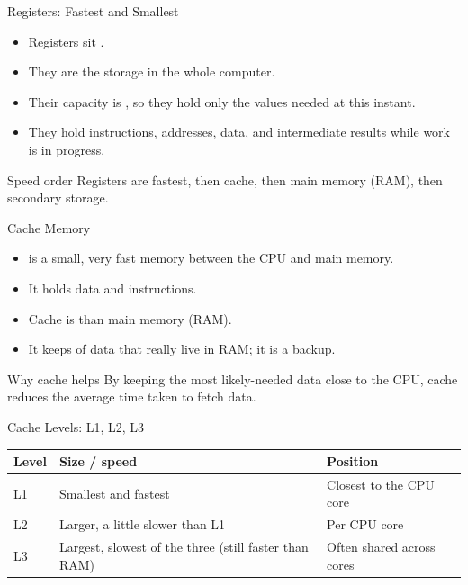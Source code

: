 \documentclass[aspectratio=169]{beamer}
\begin{document}
\begin{frame}{Registers: Fastest and Smallest}
  \begin{itemize}
    \item Registers sit .
    \item They are the  storage in the whole computer.
    \item Their capacity is , so they hold only the values
      needed at this instant.
    \item They hold instructions, addresses, data, and intermediate results
      while work is in progress.
  \end{itemize}
  \begin{alertblock}{Speed order}
    Registers are fastest, then cache, then main memory (RAM), then
    secondary storage.
  \end{alertblock}
\end{frame}

\begin{frame}{Cache Memory}
  \begin{itemize}
    \item {} is a small, very fast memory between the CPU and main
      memory.
    \item It holds  data and instructions.
    \item Cache is  than main memory (RAM).
    \item It keeps  of data that really live in RAM; it is
       a backup.
  \end{itemize}
  \begin{block}{Why cache helps}
    By keeping the most likely-needed data close to the CPU, cache reduces
    the average time taken to fetch data.
  \end{block}
\end{frame}

\begin{frame}{Cache Levels: L1, L2, L3}
  \begin{center}
    \begin{tabular}{p{}p{}p{}}
      \toprule
      \textbf{Level} & \textbf{Size / speed} & \textbf{Position} \\
      \midrule
      L1 & Smallest and fastest & Closest to the CPU core \\
      L2 & Larger, a little slower than L1 & Per CPU core \\
      L3 & Largest, slowest of the three (still faster than RAM) & Often shared across cores \\
      \bottomrule
    \end{tabular}
  \end{center}
  \vspace{0.25cm}
\end{frame}
\end{document}
